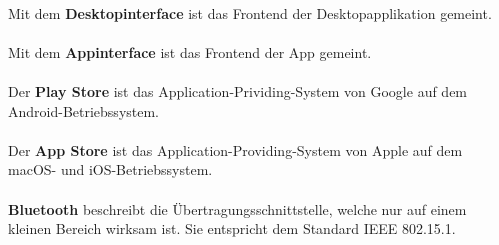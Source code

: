 \\
Mit dem \textbf{Desktopinterface} ist das Frontend der Desktopapplikation gemeint.
\\
\\
Mit dem \textbf{Appinterface} ist das Frontend der App gemeint.
\\
\\
Der \textbf{Play Store} ist das Application-Prividing-System von Google auf dem Android-Betriebssystem.
\\
\\
Der \textbf{App Store} ist das Application-Providing-System von Apple auf dem macOS- und iOS-Betriebssystem.
\\
\\
\textbf{Bluetooth} beschreibt die Übertragungsschnittstelle, welche nur auf einem kleinen Bereich wirksam ist. Sie entspricht dem Standard IEEE 802.15.1.